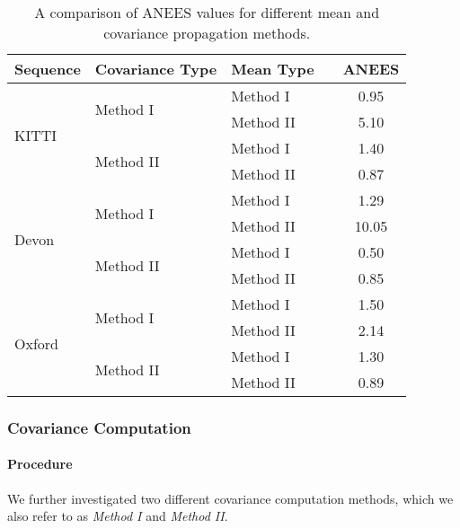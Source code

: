 \begin{table}[]
\centering
\caption{A comparison of ANEES values for different mean and covariance propagation methods.}
\label{tab:sun-bcnn_cov_estimation_comp}
\begin{tabular}{@{}lllcc@{}}
\textbf{Sequence}                & \textbf{Covariance Type}              &   \textbf{Mean Type}   &  & \textbf{ANEES} \\ \midrule
\multirow{4}{*}{KITTI}  & \multirow{2}{*}{Method I} &  Method I &  & 0.95  \\
                        &                         &   Method II &  & 5.10  \B \\  
                        
                        & \multirow{2}{*}{Method II} &  Method I &  & 1.40  \T \\
                        &                         &   Method II &  & 0.87  \\ \midrule
                        
\multirow{4}{*}{Devon}  & \multirow{2}{*}{Method I} &   Method I &  & 1.29   \\
                        &                         &   Method II &  & 10.05 \B \\
                        
                        & \multirow{2}{*}{Method II} &   Method I &  & 0.50  \T\\
                        &                         &   Method II &  & 0.85  \\ \midrule
                        
\multirow{4}{*}{Oxford} & \multirow{2}{*}{Method I} &   Method I &  & 1.50  \\
                        &                         &   Method II &  & 2.14  \B \\
                        & \multirow{2}{*}{Method II} &   Method I &  & 1.30  \T \\
                        &                         &   Method II &  & 0.89  \\ \bottomrule
\end{tabular}
\end{table}

\subsubsection{Covariance Computation}
\paragraph{Procedure}
We further investigated two different covariance computation methods, which we also refer to as \emph{Method I} and \emph{Method II}. 

